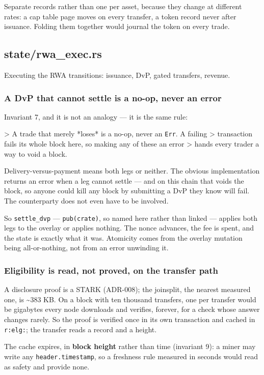 \documentclass[11pt,a4paper]{article}
\begin{document}
Separate records rather than one per asset, because they change at different
rates: a cap table page moves on every transfer, a token record never after
issuance. Folding them together would journal the token on every trade.

\subsection{state/rwa\_exec.rs}
Executing the RWA transitions: issuance, DvP, gated transfers, revenue.

\subsubsection{A DvP that cannot settle is a no-op, never an error}

Invariant 7, and it is not an analogy — it is the same rule:

> A trade that merely *loses* is a no-op, never an \texttt{Err}. A failing
> transaction fails its whole block here, so making any of these an error
> hands every trader a way to void a block.

Delivery-versus-payment means both legs or neither. The obvious
implementation returns an error when a leg cannot settle — and on this chain
that voids the block, so anyone could kill any block by submitting a DvP
they know will fail. The counterparty does not even have to be involved.

So \texttt{settle\_dvp} — \texttt{pub(crate)}, so named here rather than linked —
applies both legs to the overlay or applies
nothing. The nonce advances, the fee is spent, and the state is exactly what
it was. Atomicity comes from the overlay mutation being all-or-nothing, not
from an error unwinding it.

\subsubsection{Eligibility is read, not proved, on the transfer path}

A disclosure proof is a STARK (ADR-008); the joinsplit, the nearest measured
one, is \textasciitilde{}383 KB. On a block with ten thousand transfers, one per transfer
would be gigabytes every node downloads and verifies, forever, for a check
whose answer changes rarely. So the proof is
verified once in its own transaction and cached in \texttt{r:elg:}; the transfer
reads a record and a height.

The cache expires, in \textbf{block height} rather than time (invariant 9): a
miner may write any \texttt{header.timestamp}, so a freshness rule measured in
seconds would read as safety and provide none.
\end{document}
